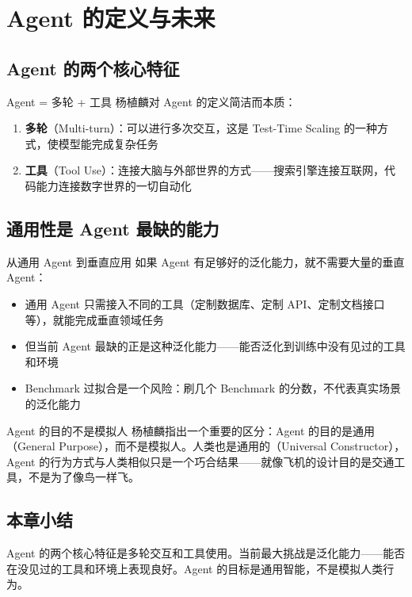 \section{Agent 的定义与未来}

\subsection{Agent 的两个核心特征}

\begin{importantbox}{Agent = 多轮 + 工具}
杨植麟对 Agent 的定义简洁而本质：
\begin{enumerate}
    \item \textbf{多轮}（Multi-turn）：可以进行多次交互，这是 Test-Time Scaling 的一种方式，使模型能完成复杂任务
    \item \textbf{工具}（Tool Use）：连接大脑与外部世界的方式——搜索引擎连接互联网，代码能力连接数字世界的一切自动化
\end{enumerate}
\end{importantbox}

\subsection{通用性是 Agent 最缺的能力}

\begin{importantbox}{从通用 Agent 到垂直应用}
如果 Agent 有足够好的泛化能力，就不需要大量的垂直 Agent：
\begin{itemize}
    \item 通用 Agent 只需接入不同的工具（定制数据库、定制 API、定制文档接口等），就能完成垂直领域任务
    \item 但当前 Agent 最缺的正是这种泛化能力——能否泛化到训练中没有见过的工具和环境
    \item Benchmark 过拟合是一个风险：刷几个 Benchmark 的分数，不代表真实场景的泛化能力
\end{itemize}
\end{importantbox}

\begin{knowledgebox}{Agent 的目的不是模拟人}
杨植麟指出一个重要的区分：Agent 的目的是通用（General Purpose），而不是模拟人。人类也是通用的（Universal Constructor），Agent 的行为方式与人类相似只是一个巧合结果——就像飞机的设计目的是交通工具，不是为了像鸟一样飞。
\end{knowledgebox}

\subsection{本章小结}

Agent 的两个核心特征是多轮交互和工具使用。当前最大挑战是泛化能力——能否在没见过的工具和环境上表现良好。Agent 的目标是通用智能，不是模拟人类行为。


